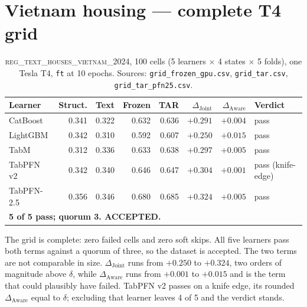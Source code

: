 \documentclass[10pt,letterpaper]{article}
\newcommand{\dj}{\Delta_{\mathrm{Joint}}}
\newcommand{\da}{\Delta_{\mathrm{Aware}}}
\begin{document}
\section{Vietnam housing --- complete T4 grid}
\label{app:vietnam}

\begin{table}[H]
\centering\small
\caption{\textsc{reg\_text\_houses\_vietnam\_2024}, 100 cells (5 learners $\times$ 4 states
$\times$ 5 folds), one Tesla T4, \texttt{ft} at 10 epochs. Sources:
\texttt{grid\_frozen\_gpu.csv}, \texttt{grid\_tar.csv}, \texttt{grid\_tar\_pfn25.csv}.}
\begin{tabular}{lrrrrrrl}
\toprule
Learner & Struct. & Text & Frozen & TAR & $\dj$ & $\da$ & Verdict \\
\midrule
CatBoost   & 0.341 & 0.322 & 0.632 & 0.636 & $+0.291$ & $+0.004$ & pass \\
LightGBM   & 0.342 & 0.310 & 0.592 & 0.607 & $+0.250$ & $+0.015$ & pass \\
TabM       & 0.312 & 0.336 & 0.633 & 0.638 & $+0.297$ & $+0.005$ & pass \\
TabPFN v2  & 0.342 & 0.340 & 0.646 & 0.647 & $+0.304$ & $+0.001$ & pass (knife-edge) \\
TabPFN-2.5 & 0.356 & 0.346 & 0.680 & 0.685 & $+0.324$ & $+0.005$ & pass \\
\midrule
\multicolumn{8}{l}{\textbf{5 of 5 pass; quorum 3. ACCEPTED.}} \\
\bottomrule
\end{tabular}
\end{table}

\noindent The grid is complete: zero failed cells and zero soft skips. All five learners pass both terms
against a quorum of three, so the dataset is accepted. The two terms are not comparable in
size. $\dj$ runs from $+0.250$ to $+0.324$, two orders of magnitude above $\delta$, while
$\da$ runs from $+0.001$ to $+0.015$ and is the term that could plausibly have failed. TabPFN
v2 passes on a knife edge, its rounded $\da$ equal to $\delta$; excluding that learner leaves
4 of 5 and the verdict stands.
\end{document}
